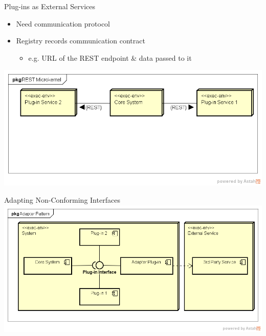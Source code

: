 \documentclass{slide}
\begin{document}
\begin{frame}{Plug-ins as External Services}
    \begin{itemize}
        \LARGE\item Need communication protocol
        \LARGE\item Registry records communication contract
        \begin{itemize}
            \Large\item e.g. URL of the REST endpoint \& data passed to it
        \end{itemize}
    \end{itemize}
    \vspace{1cm}
    \includegraphics[trim=38 167 19 45,clip,width=\textwidth]{../../notes/microkernel/diagrams/rest-microkernel.png}
\end{frame}

\begin{frame}{Adapting Non-Conforming Interfaces}
    \includegraphics[trim=38 58 20 45,clip,width=\textwidth]{../../notes/microkernel/diagrams/adapter-plug-in.png}
\end{frame}
\end{document}
